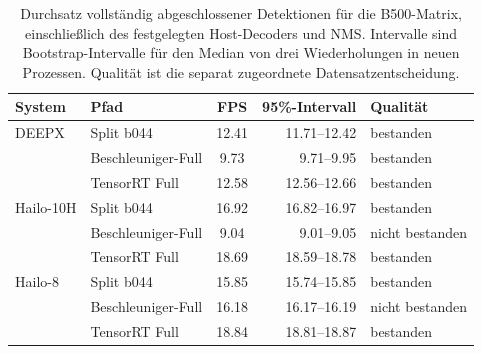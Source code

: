 \begin{table}[htbp]
\centering\small\TableSetup
\caption{Durchsatz vollständig abgeschlossener Detektionen für die B500-Matrix, einschließlich des festgelegten Host-Decoders und NMS. Intervalle sind Bootstrap-Intervalle für den Median von drei Wiederholungen in neuen Prozessen. Qualität ist die separat zugeordnete Datensatzentscheidung.}
\label{tab:evaluation:yolov7_standard_native}
\begin{tabularx}{\linewidth}{@{}L{1.55cm}Y S[table-format=2.2]r l@{}}
\toprule
\textbf{System} & \textbf{Pfad} & {\textbf{FPS}} & \textbf{95\%-Intervall} & \textbf{Qualität} \\
\midrule
DEEPX & Split b044 & 12.41 & \num{11.71}--\num{12.42} & bestanden \\
 & Beschleuniger-Full & 9.73 & \num{9.71}--\num{9.95} & bestanden \\
 & TensorRT Full & 12.58 & \num{12.56}--\num{12.66} & bestanden \\
\addlinespace[.3em]
Hailo-10H & Split b044 & 16.92 & \num{16.82}--\num{16.97} & bestanden \\
 & Beschleuniger-Full & 9.04 & \num{9.01}--\num{9.05} & nicht bestanden \\
 & TensorRT Full & 18.69 & \num{18.59}--\num{18.78} & bestanden \\
\addlinespace[.3em]
Hailo-8 & Split b044 & 15.85 & \num{15.74}--\num{15.85} & bestanden \\
 & Beschleuniger-Full & 16.18 & \num{16.17}--\num{16.19} & nicht bestanden \\
 & TensorRT Full & 18.84 & \num{18.81}--\num{18.87} & bestanden \\
\bottomrule
\end{tabularx}
\end{table}

